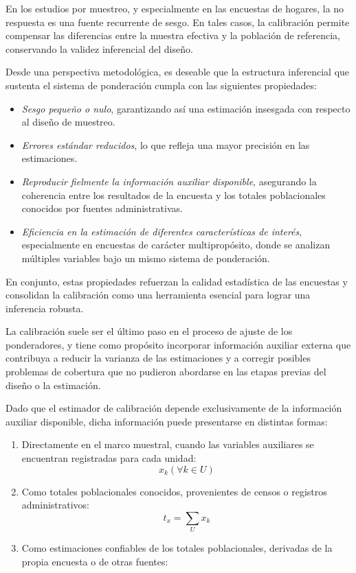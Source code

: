 \documentclass[
  spanish,
  12pt,
]{book}
\begin{document}
En los estudios por muestreo, y especialmente en las encuestas de hogares, la no respuesta es una fuente recurrente de sesgo. En tales casos, la calibración permite compensar las diferencias entre la muestra efectiva y la población de referencia, conservando la validez inferencial del diseño.

Desde una perspectiva metodológica, es deseable que la estructura inferencial que sustenta el sistema de ponderación cumpla con las siguientes propiedades:

\begin{itemize}
\item
  \emph{Sesgo pequeño o nulo}, garantizando así una estimación insesgada con respecto al diseño de muestreo.
\item
  \emph{Errores estándar reducidos}, lo que refleja una mayor precisión en las estimaciones.
\item
  \emph{Reproducir fielmente la información auxiliar disponible}, asegurando la coherencia entre los resultados de la encuesta y los totales poblacionales conocidos por fuentes administrativas.
\item
  \emph{Eficiencia en la estimación de diferentes características de interés}, especialmente en encuestas de carácter multipropósito, donde se analizan múltiples variables bajo un mismo sistema de ponderación.
\end{itemize}

En conjunto, estas propiedades refuerzan la calidad estadística de las encuestas y consolidan la calibración como una herramienta esencial para lograr una inferencia robusta.

La calibración suele ser el último paso en el proceso de ajuste de los ponderadores, y tiene como propósito incorporar información auxiliar externa que contribuya a reducir la varianza de las estimaciones y a corregir posibles problemas de cobertura que no pudieron abordarse en las etapas previas del diseño o la estimación.

Dado que el estimador de calibración depende exclusivamente de la información auxiliar disponible, dicha información puede presentarse en distintas formas:

\begin{enumerate}
\def\labelenumi{\arabic{enumi}.}
\item
  Directamente en el marco muestral, cuando las variables auxiliares se encuentran registradas para cada unidad: \[x_k  (\forall k \in U)\]
\item
  Como totales poblacionales conocidos, provenientes de censos o registros administrativos: \[t_x = \sum_U x_k\]
\item
  Como estimaciones confiables de los totales poblacionales, derivadas de la propia encuesta o de otras fuentes:
\end{enumerate}
\end{document}
